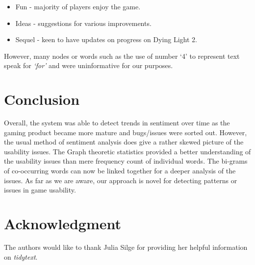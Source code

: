 \documentclass{ewic}
\begin{document}
\begin{itemize}
\item Fun  - majority of players enjoy the game.
\item Ideas - suggestions for various improvements.
\item Sequel - keen to have updates on progress on Dying Light 2.
\end{itemize}

However, many nodes or words  such as the use of number `4' to represent text speak for {\it `for'} and were uninformative for our purposes. 

\section{Conclusion}
Overall, the system was able to detect trends in sentiment over time as the gaming product became more mature and bugs/issues were sorted out. However, the usual method of sentiment analysis does give a rather skewed picture of the usability issues. The Graph theoretic statistics provided a better understanding of the usability issues than mere frequency count of individual words. The bi-grams of co-occurring words can now be linked together for a deeper analysis of the issues. As far as we are aware, our approach is novel for detecting patterns or issues in game usability.

\section{Acknowledgment}
The authors would like to thank Julia Silge for providing her helpful information on {\it tidytext}.



\end{document}
